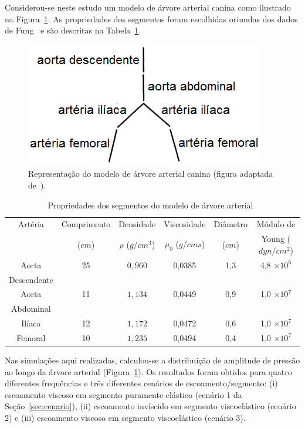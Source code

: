 \documentclass[a4paper,12pt]{monografia}
\theoremstyle{plain}
\theoremstyle{definition}
\theoremstyle{remark}
\begin{document}
Considerou-se neste estudo um modelo de árvore arterial canina como ilustrado na Figura~\ref{fig:arvore-canina}. As propriedades dos segmentos foram escolhidas oriundas dos dados de Fung~\cite{Fung} e são descritas na Tabela~\ref{tab1:proprerty}. 

\begin{figure}[!htbp]
	\centering
	\includegraphics[scale=0.8]{Figures/tree_canine.png}
	\caption{Representação do modelo de árvore arterial canina (figura adaptada de~\cite{Duan}).}
	\label{fig:arvore-canina}
\end{figure}

\begin{table}[!htbp]
	\caption{Propriedades dos segmentos do modelo de árvore arterial~\cite{Duan,Fung}}
	\centering{}
	\begin{tabular}{|c||c|c|c|c|c|}
		\hline 
		Artéria	& Comprimento & Densidade & Viscosidade  & Diâmetro & Módulo de  \\ 
		& ($cm$) & $\rho$ ($g/cm^3$) & $\mu_0$ ($g/cm s$) & ($cm$) & Young ($dyn/cm^2$) \\ 
		\hline
		\hline 
		Aorta & 25 & $0,960$ & 0,0385 & 1,3 &4,8 $\times 10^6$ \\ 
		Descendente &  & &  & & \\ 
		\hline 
		Aorta & 11 & $1,134$ & 0,0449 & 0,9 & 1,0 $\times 10^7$ \\
		Abdominal &  & &  & &  \\ 
		\hline 
		Ilíaca & 12 & $1,172$ & 0,0472 & 0,6 & 1,0 $\times 10^7$\\ 
		\hline 
		Femoral & 10 & $1,235$ & 0,0494 & 0,4 & 1,0 $\times 10^7$\\ 
		\hline 
	\end{tabular} 
	\label{tab1:proprerty}
\end{table}

Nas simulações aqui realizadas, calculou-se a distribuição de amplitude de pressão ao longo da árvore arterial (Figura~\ref{fig:arvore-canina}). Os resultados foram obtidos para quatro diferentes frequên\-cias e três diferentes cenários de escoamento/segmento: (i) escoamento viscoso em segmento puramente elástico (cenário 1 da Seção~\ref{sec:cenario}), (ii) escoamento invíscido em segmento viscoelástico (cenário 2) e (iii) escoamento viscoso em segmento viscoelástico (cenário 3). 
\end{document}
